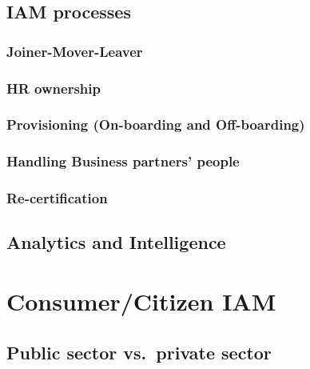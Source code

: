 \hypertarget{iam-processes}{%
\section{IAM processes}\label{iam-processes}}

\hypertarget{joiner-mover-leaver}{%
\subsection{Joiner-Mover-Leaver}\label{joiner-mover-leaver}}

\hypertarget{hr-ownership}{%
\subsection{HR ownership}\label{hr-ownership}}

\hypertarget{provisioning-on-boarding-and-off-boarding}{%
\subsection{Provisioning (On-boarding and
Off-boarding)}\label{provisioning-on-boarding-and-off-boarding}}

\hypertarget{handling-business-partners-people}{%
\subsection{Handling Business partners'
people}\label{handling-business-partners-people}}

\hypertarget{re-certification}{%
\subsection{Re-certification}\label{re-certification}}

\hypertarget{analytics-and-intelligence}{%
\section{Analytics and
Intelligence}\label{analytics-and-intelligence}}

\hypertarget{consumercitizen-iam-1}{%
\chapter{Consumer/Citizen IAM}\label{consumercitizen-iam-1}}

\hypertarget{public-sector-vs.private-sector}{%
\section{Public sector vs.~private
sector}\label{public-sector-vs.private-sector}}


